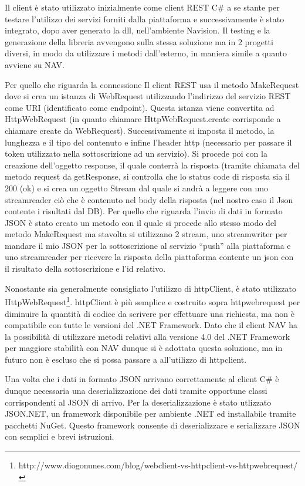 Il client è stato utilizzato inizialmente come client REST C\# a se stante per testare l’utilizzo dei servizi forniti dalla piattaforma e successivamente è stato integrato, dopo aver generato la dll, nell’ambiente Navision. Il testing e la generazione della libreria avvengono sulla stessa soluzione ma in 2 progetti diversi, in modo da utilizzare i metodi dall’esterno, in maniera simile a quanto avviene su NAV.

Per quello che riguarda la connessione Il client REST usa il metodo MakeRequest dove si crea un istanza di WebRequest utilizzando l’indirizzo del servizio REST come URI (identificato come endpoint). Questa istanza viene convertita ad HttpWebRequest (in quanto chiamare HttpWebRequest.create corrisponde a chiamare create da WebRequest). Successivamente si imposta il metodo, la lunghezza e il tipo del contenuto e infine l’header http (necessario per passare il token utilizzato nella sottoscrizione ad un servizio). Si procede poi con la creazione dell’oggetto response, il quale conterrà la risposta (tramite chiamata del metodo request da getResponse,  si controlla che lo status code di risposta sia il 200 (ok) e si crea un oggetto Stream dal quale si andrà a leggere con uno streamreader ciò che è contenuto nel body della risposta (nel nostro caso il Json contente i risultati dal DB).
\clearpage
Per quello che riguarda l’invio di dati in formato JSON è stato creato un metodo con il quale si procede allo stesso modo del metodo MakeRequest ma stavolta si utilizzano 2 stream, uno streamwriter per mandare il mio JSON per la sottoscrizione al servizio “push” alla piattaforma e uno streamreader per ricevere la risposta della piattaforma contente un json con il risultato della sottoscrizione e l’id relativo.

Nonostante sia generalmente consigliato l’utilizzo di httpClient, è stato utilizzato HttpWebRequest\footnote{http://www.diogonunes.com/blog/webclient-vs-httpclient-vs-httpwebrequest/}. httpClient è più semplice e costruito sopra httpwebrequest per diminuire la quantità di codice da scrivere per effettuare una richiesta, ma non è compatibile con tutte le versioni del .NET Framework. Dato che il client NAV ha la possibilità di utilizzare metodi relativi alla versione 4.0 del .NET Framework per maggiore stabilità con NAV dunque si è adottata questa soluzione, ma in futuro non è escluso che si possa passare a all’utilizzo di httpclient.

Una volta che i dati in formato JSON arrivano correttamente al client C\# è dunque necessaria una deserializzazione dei dati tramite opportune classi corrispondenti al JSON di arrivo. Per la deserializzazione è stato utlizzato JSON.NET, un framework disponibile per ambiente .NET ed installabile tramite pacchetti NuGet. Questo framework consente di deserializzare e serializzare JSON con semplici e brevi istruzioni.



